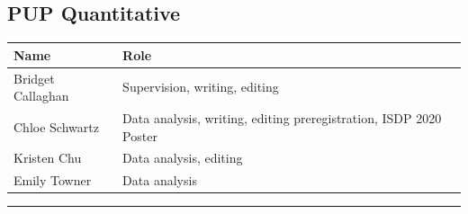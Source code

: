 \documentclass[]{book}
\begin{document}
\hypertarget{pup-quantitative}{%
\subsection{PUP Quantitative}\label{pup-quantitative}}

\begin{longtable}[]{@{}ll@{}}
\toprule
\begin{minipage}[b]{0.22\columnwidth}\raggedright
Name\strut
\end{minipage} & \begin{minipage}[b]{0.72\columnwidth}\raggedright
Role\strut
\end{minipage}\tabularnewline
\midrule
\endhead
\begin{minipage}[t]{0.22\columnwidth}\raggedright
Bridget Callaghan\strut
\end{minipage} & \begin{minipage}[t]{0.72\columnwidth}\raggedright
Supervision, writing, editing\strut
\end{minipage}\tabularnewline
\begin{minipage}[t]{0.22\columnwidth}\raggedright
Chloe Schwartz\strut
\end{minipage} & \begin{minipage}[t]{0.72\columnwidth}\raggedright
Data analysis, writing, editing preregistration, ISDP 2020 Poster\strut
\end{minipage}\tabularnewline
\begin{minipage}[t]{0.22\columnwidth}\raggedright
Kristen Chu\strut
\end{minipage} & \begin{minipage}[t]{0.72\columnwidth}\raggedright
Data analysis, editing\strut
\end{minipage}\tabularnewline
\begin{minipage}[t]{0.22\columnwidth}\raggedright
Emily Towner\strut
\end{minipage} & \begin{minipage}[t]{0.72\columnwidth}\raggedright
Data analysis\strut
\end{minipage}\tabularnewline
\bottomrule
\end{longtable}

\begin{center}\rule{0.5\linewidth}{0.5pt}\end{center}


\end{document}
